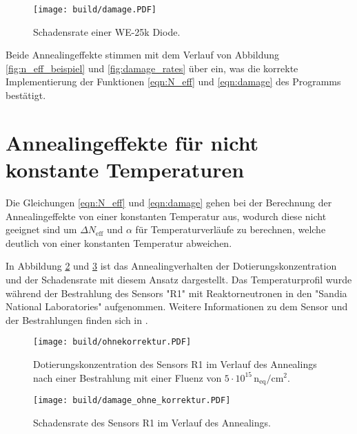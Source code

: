 \begin{figure}
  \centering
    \texttt{[image: build/damage.PDF]}
    \caption{Schadensrate einer WE-25k Diode.}
    \label{fig:damage}
\end{figure}

Beide Annealingeffekte stimmen mit dem Verlauf von Abbildung \ref{fig:n_eff_beispiel} und \ref{fig:damage_rates} über ein, was
die korrekte Implementierung der Funktionen \ref{eqn:N_eff} und \ref{eqn:damage}  des Programms
bestätigt.



\section{Annealingeffekte für nicht konstante Temperaturen}{\label{nicht_konstant}}
Die Gleichungen \ref{eqn:N_eff} und \ref{eqn:damage} gehen bei der Berechnung der Annealingeffekte von
einer konstanten Temperatur aus, wodurch diese nicht geeignet sind um $\Delta N_{\mathrm{eff}}$ und $\alpha$ für
Temperaturverläufe zu berechnen, welche deutlich von einer konstanten Temperatur abweichen.


In Abbildung \ref{fig:N_eff_ohne} und \ref{fig:damage_ohne} ist das Annealingverhalten
der Dotierungskonzentration und der Schadensrate mit
diesem Ansatz dargestellt.
Das Temperaturprofil wurde während der Bestrahlung
des Sensors "R1" mit Reaktorneutronen in den
"Sandia National Laboratories" aufgenommen.
Weitere Informationen zu dem Sensor und
der Bestrahlungen finden sich in \cite{mareike}.

\begin{figure}
  \centering
    \texttt{[image: build/ohnekorrektur.PDF]}
    \caption{Dotierungskonzentration des Sensors R1 im Verlauf des Annealings nach einer Bestrahlung mit einer Fluenz von
    $5\cdot 10^{15} \, \mathrm{n_{eq}/cm^2}$.}
    \label{fig:N_eff_ohne}
\end{figure}

\begin{figure}
  \centering
    \texttt{[image: build/damage\_ohne\_korrektur.PDF]}
    \caption{Schadensrate des Sensors R1 im Verlauf des Annealings.}
    \label{fig:damage_ohne}
\end{figure}

